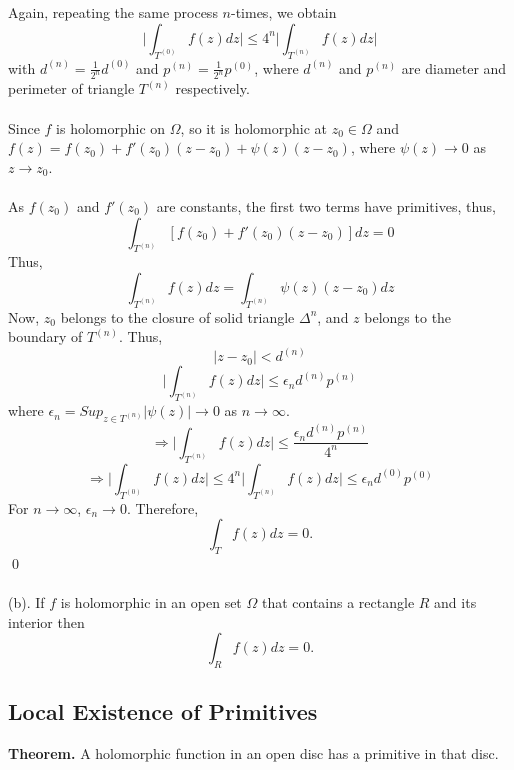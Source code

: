 \documentclass{article}
\begin{document}
\\
\\
Again, repeating the same process $n$-times, we obtain
\[
\Big|\int_{T^{(0)}}f(z)dz\Big|\leq4^n\Big|\int_{T^{(n)}}f(z)dz\Big|
\]
with $d^{(n)}=\frac{1}{2^n}d^{(0)}$ and $p^{(n)}=\frac{1}{2^n}p^{(0)}$, where $d^{(n)}$ and $p^{(n)}$ are diameter and perimeter of triangle $T^{(n)}$ respectively.
\\
\\
Since $f$ is holomorphic on $\Omega$, so it is holomorphic at $z_0\in \Omega$ and $f(z)=f(z_0)+f'(z_0)(z-z_0)+\psi(z)(z-z_0)$, where $\psi(z)\to 0$ as $z\to z_0$.
\\
\\
As $f(z_0)$ and $f'(z_0)$ are constants, the first two terms have primitives, thus, 
\[
\int_{T^{(n)}}[f(z_0)+f'(z_0)(z-z_0)]dz=0
\]
Thus,
\[
\int_{T^{(n)}}f(z)dz=\int_{T^{(n)}}\psi(z)(z-z_0)dz
\]
Now, $z_0$ belongs to the closure of solid triangle $\Delta^n$, and $z$ belongs to the boundary of $T^{(n)}$. Thus,
\[
|z-z_0|<d^{(n)}
\]
\[
\Big|\int_{T^{(n)}}f(z)dz\Big| \leq\epsilon_nd^{(n)}p^{(n)}
\]
where $\epsilon_n=Sup_{z\in T^{(n)}}|\psi(z)|\to 0$ as $n\to \infty$.
\[
\Rightarrow \Big|\int_{T^{(n)}}f(z)dz\Big| \leq \frac{\epsilon_nd^{(n)}p^{(n)}}{4^n}
\]
\[
\Rightarrow \Big|\int_{T^{(0)}}f(z)dz\Big|\leq4^n\Big|\int_{T^{(n)}}f(z)dz\Big|\leq\epsilon_nd^{(0)}p^{(0)}
\]
For $n\to \infty$, $\epsilon_n\to 0$. Therefore,
\[
\boxed{\int_{T}f(z)dz=0.}
\]
\qed
\\
\\
(b). If $f$ is holomorphic in an open set $\Omega$ that contains a rectangle $R$ and its interior then
\[
\int_{R}f(z)dz=0.
\]
\subsection{Local Existence of Primitives}
\textbf{Theorem.}
A holomorphic function in an open disc has a primitive in that disc.
\end{document}
